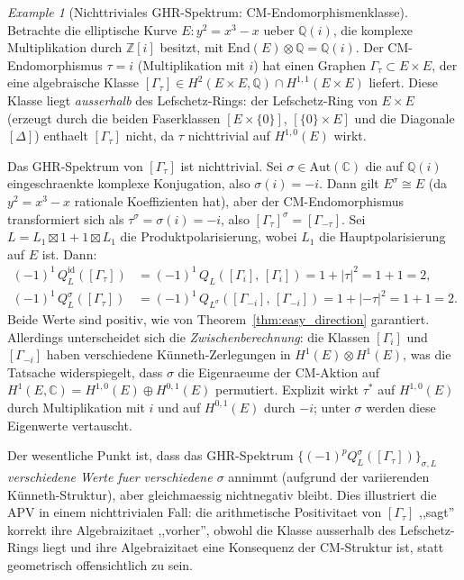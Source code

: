 \documentclass[aps,prd,twocolumn,superscriptaddress,nofootinbib]{revtex4-2}
\theoremstyle{definition}
\theoremstyle{remark}
\newtheorem{example}[theorem]{Example}
\begin{document}
\begin{example}[Nichttriviales GHR-Spektrum: CM-Endomorphismenklasse]
\label{ex:cm_endomorphism}
Betrachte die elliptische Kurve $E: y^2 = x^3 - x$ ueber $\mathbb{Q}(i)$, die komplexe Multiplikation durch $\mathbb{Z}[i]$ besitzt, mit $\mathrm{End}(E) \otimes \mathbb{Q} = \mathbb{Q}(i)$. Der CM-Endomorphismus $\tau = i$ (Multiplikation mit $i$) hat einen Graphen $\Gamma_\tau \subset E \times E$, der eine algebraische Klasse $[\Gamma_\tau] \in H^2(E \times E, \mathbb{Q}) \cap H^{1,1}(E \times E)$ liefert. Diese Klasse liegt \emph{ausserhalb} des Lefschetz-Rings: der Lefschetz-Ring von $E \times E$ (erzeugt durch die beiden Faserklassen $[E \times \{0\}]$, $[\{0\} \times E]$ und die Diagonale $[\Delta]$) enthaelt $[\Gamma_\tau]$ nicht, da $\tau$ nichttrivial auf $H^{1,0}(E)$ wirkt.

Das GHR-Spektrum von $[\Gamma_\tau]$ ist nichttrivial. Sei $\sigma \in \mathrm{Aut}(\mathbb{C})$ die auf $\mathbb{Q}(i)$ eingeschraenkte komplexe Konjugation, also $\sigma(i) = -i$. Dann gilt $E^\sigma \cong E$ (da $y^2 = x^3 - x$ rationale Koeffizienten hat), aber der CM-Endomorphismus transformiert sich als $\tau^\sigma = \sigma(i) = -i$, also $[\Gamma_\tau]^\sigma = [\Gamma_{-\tau}]$. Sei $L = L_1 \boxtimes 1 + 1 \boxtimes L_1$ die Produktpolarisierung, wobei $L_1$ die Hauptpolarisierung auf $E$ ist. Dann:
\begin{align}
(-1)^1\, Q_L^\mathrm{id}([\Gamma_\tau]) &= (-1)^1\, Q_L([\Gamma_i],\, [\Gamma_i]) = 1 + |\tau|^2 = 1 + 1 = 2, \label{eq:cm_id}\\
(-1)^1\, Q_L^\sigma([\Gamma_\tau]) &= (-1)^1\, Q_{L^\sigma}([\Gamma_{-i}],\, [\Gamma_{-i}]) = 1 + |-\tau|^2 = 1 + 1 = 2. \label{eq:cm_sigma}
\end{align}
Beide Werte sind positiv, wie von Theorem~\ref{thm:easy_direction} garantiert. Allerdings unterscheidet sich die \emph{Zwischenberechnung}: die Klassen $[\Gamma_i]$ und $[\Gamma_{-i}]$ haben verschiedene K\"unneth-Zerlegungen in $H^1(E) \otimes H^1(E)$, was die Tatsache widerspiegelt, dass $\sigma$ die Eigenraeume der CM-Aktion auf $H^1(E, \mathbb{C}) = H^{1,0}(E) \oplus H^{0,1}(E)$ permutiert. Explizit wirkt $\tau^*$ auf $H^{1,0}(E)$ durch Multiplikation mit $i$ und auf $H^{0,1}(E)$ durch $-i$; unter $\sigma$ werden diese Eigenwerte vertauscht.

Der wesentliche Punkt ist, dass das GHR-Spektrum $\{(-1)^p Q_L^\sigma([\Gamma_\tau])\}_{\sigma, L}$ \emph{verschiedene Werte fuer verschiedene $\sigma$} annimmt (aufgrund der variierenden K\"unneth-Struktur), aber gleichmaessig nichtnegativ bleibt. Dies illustriert die APV in einem nichttrivialen Fall: die arithmetische Positivitaet von $[\Gamma_\tau]$ ,,sagt'' korrekt ihre Algebraizitaet ,,vorher'', obwohl die Klasse ausserhalb des Lefschetz-Rings liegt und ihre Algebraizitaet eine Konsequenz der CM-Struktur ist, statt geometrisch offensichtlich zu sein.
\end{example}
\end{document}
